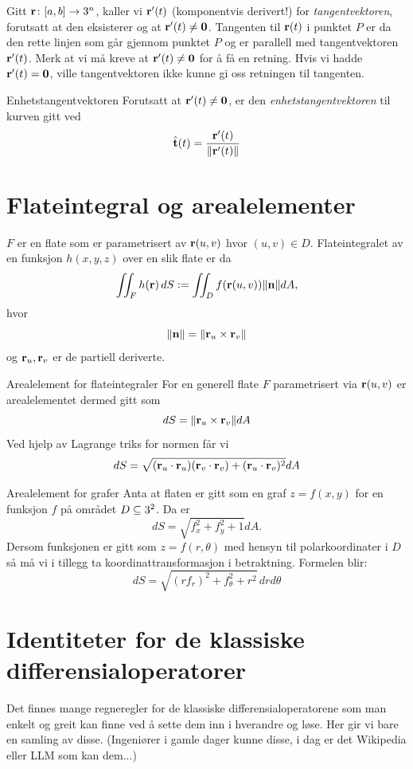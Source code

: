 Gitt \( \mathbf{r} \colon [a,b] \rightarrow 3^n \), kaller vi \( \mathbf{r}'(t) \) (komponentvis derivert!) for \emph{tangentvektoren}, forutsatt at den eksisterer og at \( \mathbf{r}'(t) \ne \mathbf{0} \). Tangenten til \( \mathbf{r}(t) \) i punktet \( P \) er da den rette linjen som går gjennom punktet \( P \) og er parallell med tangentvektoren \( \mathbf{r}'(t) \). Merk at vi må kreve at \( \mathbf{r}'(t) \ne \mathbf{0} \) for å få en retning. Hvis vi hadde \( \mathbf{r}'(t) = \mathbf{0} \), ville tangentvektoren ikke kunne gi oss retningen til tangenten.

\begin{defn}{Enhetstangentvektoren} \label{defn:enhetstangent}
Forutsatt at \( \mathbf{r}'(t) \ne \mathbf{0} \), er den \emph{enhetstangentvektoren} til kurven gitt ved
\[
\hat{\mathbf{t}}(t) = \frac{\mathbf{r}'(t)}{\left\lVert \mathbf{r}'(t) \right\rVert}
\]
\end{defn}

\section{Flateintegral og arealelementer}

\( F \) er en flate som er parametrisert av $\mathbf{r}(u, v)$ hvor $(u,v)\in D$. Flateintegralet av en  funksjon $h(x,y,z)$ over en slik flate er da
\[\iint_F h(\mathbf{r})\, dS := \iint_D f(\mathbf{r}(u,v))\lVert \mathbf{n}\rVert dA,\]
hvor 
\[\lVert \mathbf{n}\rVert=\lVert\mathbf{r}_u \times \mathbf{r}_v\rVert\]
og $\mathbf{r}_u,\mathbf{r}_v$ er de partiell deriverte.

\begin{oppsum}{Arealelement for flateintegraler}
For en generell flate $F$ parametrisert via $\mathbf{r}(u,v)$ er arealelementet dermed gitt som 
\[dS =  \lVert\mathbf{r}_u \times \mathbf{r}_v\rVert dA\]
Ved hjelp av Lagrange triks for normen får vi
\[dS = \sqrt{(\mathbf{r}_u \cdot \mathbf{r}_u)(\mathbf{r}_v \cdot \mathbf{r}_v) + (\mathbf{r}_u\cdot \mathbf{r}_v)^2} dA\]
\end{oppsum}

\begin{oppsum}{Arealelement for grafer}
Anta at flaten er gitt som en graf $z=f(x,y)$ for en funksjon $f$ på området $D \subseteq 3^2$.
Da er 
\[dS = \sqrt{f_x^2 + f_y^2 +1}dA.\]
Dersom funksjonen er gitt som $z=f(r,\theta)$ med hensyn til polarkoordinater i $D$ så må vi i tillegg ta koordinattransformasjon i betraktning. Formelen blir:
\[dS =  \sqrt{(rf_r)^2+f_\theta^2+r^2}\, dr d\theta\]
\end{oppsum}
\newpage
\section{Identiteter for de klassiske differensialoperatorer}\label{app:diffop_ident}
Det finnes mange regneregler for de klassiske differensialoperatorene som man enkelt og greit kan finne ved å sette dem inn i hverandre og løse. Her gir vi bare en samling av disse. (Ingeniører i gamle dager kunne disse, i dag er det Wikipedia eller LLM som kan dem...)\medskip

